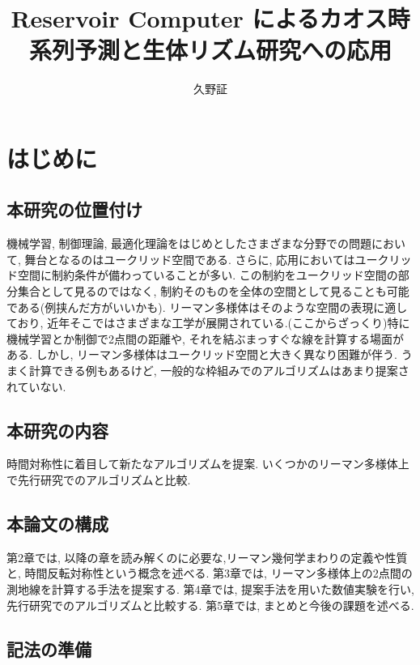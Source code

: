 \documentclass[uplatex]{suribt}
\title{Reservoir Computer によるカオス時系列予測と生体リズム研究への応用}
\author{久野証}
\theoremstyle{definition}
\begin{document}
\maketitle%

\frontmatter%
\begin{abstract}%
    
\end{abstract}

\tableofcontents%

\mainmatter%
\chapter{はじめに}

\section{本研究の位置付け}
機械学習, 制御理論, 最適化理論をはじめとしたさまざまな分野での問題において, 舞台となるのはユークリッド空間である. さらに, 応用においてはユークリッド空間に制約条件が備わっていることが多い. この制約をユークリッド空間の部分集合として見るのではなく, 制約そのものを全体の空間として見ることも可能である(例挟んだ方がいいかも). リーマン多様体はそのような空間の表現に適しており, 近年そこではさまざまな工学が展開されている.(ここからざっくり)特に機械学習とか制御で2点間の距離や, それを結ぶまっすぐな線を計算する場面がある. しかし, リーマン多様体はユークリッド空間と大きく異なり困難が伴う. うまく計算できる例もあるけど, 一般的な枠組みでのアルゴリズムはあまり提案されていない.
\section{本研究の内容}
時間対称性に着目して新たなアルゴリズムを提案. いくつかのリーマン多様体上で先行研究でのアルゴリズムと比較.
\section{本論文の構成}
第2章では, 以降の章を読み解くのに必要な,リーマン幾何学まわりの定義や性質と, 時間反転対称性という概念を述べる. 第3章では, リーマン多様体上の2点間の測地線を計算する手法を提案する. 第4章では, 提案手法を用いた数値実験を行い, 先行研究でのアルゴリズムと比較する. 第5章では, まとめと今後の課題を述べる.
\section{記法の準備}
\end{document}
